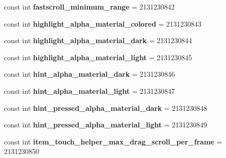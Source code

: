 \begin{DoxyCompactItemize}
const int {\bfseries fastscroll\+\_\+minimum\+\_\+range} = 2131230842
\item 
\mbox{\label{classst_delivery_1_1_resource_1_1_dimension_af0bdb6c2fee3b3610a3574230fc0d796}} 
const int {\bfseries highlight\+\_\+alpha\+\_\+material\+\_\+colored} = 2131230843
\item 
\mbox{\label{classst_delivery_1_1_resource_1_1_dimension_ae3b5f1a7c3c48ec7b6bfd3d7d4d1b212}} 
const int {\bfseries highlight\+\_\+alpha\+\_\+material\+\_\+dark} = 2131230844
\item 
\mbox{\label{classst_delivery_1_1_resource_1_1_dimension_a000f70ead2b5240052637abacee43565}} 
const int {\bfseries highlight\+\_\+alpha\+\_\+material\+\_\+light} = 2131230845
\item 
\mbox{\label{classst_delivery_1_1_resource_1_1_dimension_a776bbe3464a73237898a8e7a26866366}} 
const int {\bfseries hint\+\_\+alpha\+\_\+material\+\_\+dark} = 2131230846
\item 
\mbox{\label{classst_delivery_1_1_resource_1_1_dimension_a5122d701f49a04b51b1451b80ed2e5a4}} 
const int {\bfseries hint\+\_\+alpha\+\_\+material\+\_\+light} = 2131230847
\item 
\mbox{\label{classst_delivery_1_1_resource_1_1_dimension_a062d0fbd77f90f5f4873c79eecb806c6}} 
const int {\bfseries hint\+\_\+pressed\+\_\+alpha\+\_\+material\+\_\+dark} = 2131230848
\item 
\mbox{\label{classst_delivery_1_1_resource_1_1_dimension_a8ee9310e5d90932c05a8722a67f380bd}} 
const int {\bfseries hint\+\_\+pressed\+\_\+alpha\+\_\+material\+\_\+light} = 2131230849
\item 
\mbox{\label{classst_delivery_1_1_resource_1_1_dimension_afa1db53e2ba377a08fb87e3f1183179b}} 
const int {\bfseries item\+\_\+touch\+\_\+helper\+\_\+max\+\_\+drag\+\_\+scroll\+\_\+per\+\_\+frame} = 2131230850

\end{DoxyCompactItemize}
